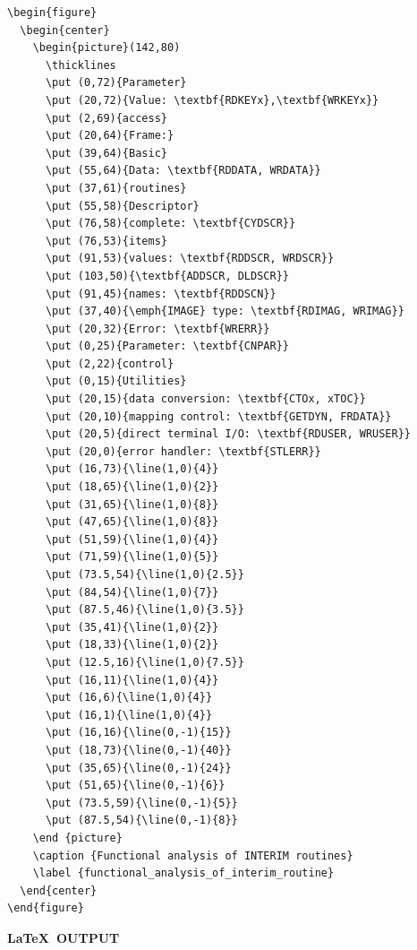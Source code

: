\documentclass[twoside,11pt]{article}
\renewcommand{\_}{\texttt{\symbol{95}}}
\begin{document}
\small
\begin{verbatim}
\begin{figure}
  \begin{center}
    \begin{picture}(142,80)
      \thicklines
      \put (0,72){Parameter}
      \put (20,72){Value: \textbf{RDKEYx},\textbf{WRKEYx}}
      \put (2,69){access}
      \put (20,64){Frame:}
      \put (39,64){Basic}
      \put (55,64){Data: \textbf{RDDATA, WRDATA}}
      \put (37,61){routines}
      \put (55,58){Descriptor}
      \put (76,58){complete: \textbf{CYDSCR}}
      \put (76,53){items}
      \put (91,53){values: \textbf{RDDSCR, WRDSCR}}
      \put (103,50){\textbf{ADDSCR, DLDSCR}}
      \put (91,45){names: \textbf{RDDSCN}}
      \put (37,40){\emph{IMAGE} type: \textbf{RDIMAG, WRIMAG}}
      \put (20,32){Error: \textbf{WRERR}}
      \put (0,25){Parameter: \textbf{CNPAR}}
      \put (2,22){control}
      \put (0,15){Utilities}
      \put (20,15){data conversion: \textbf{CTOx, xTOC}}
      \put (20,10){mapping control: \textbf{GETDYN, FRDATA}}
      \put (20,5){direct terminal I/O: \textbf{RDUSER, WRUSER}}
      \put (20,0){error handler: \textbf{STLERR}}
      \put (16,73){\line(1,0){4}}
      \put (18,65){\line(1,0){2}}
      \put (31,65){\line(1,0){8}}
      \put (47,65){\line(1,0){8}}
      \put (51,59){\line(1,0){4}}
      \put (71,59){\line(1,0){5}}
      \put (73.5,54){\line(1,0){2.5}}
      \put (84,54){\line(1,0){7}}
      \put (87.5,46){\line(1,0){3.5}}
      \put (35,41){\line(1,0){2}}
      \put (18,33){\line(1,0){2}}
      \put (12.5,16){\line(1,0){7.5}}
      \put (16,11){\line(1,0){4}}
      \put (16,6){\line(1,0){4}}
      \put (16,1){\line(1,0){4}}
      \put (16,16){\line(0,-1){15}}
      \put (18,73){\line(0,-1){40}}
      \put (35,65){\line(0,-1){24}}
      \put (51,65){\line(0,-1){6}}
      \put (73.5,59){\line(0,-1){5}}
      \put (87.5,54){\line(0,-1){8}}
    \end {picture}
    \caption {Functional analysis of INTERIM routines}
    \label {functional_analysis_of_interim_routine}
  \end{center}
\end{figure}
\end{verbatim}
\normalsize

\newpage

\begin{center}
  \textbf{\LaTeX\ OUTPUT}
\end{center}
\end{document}
